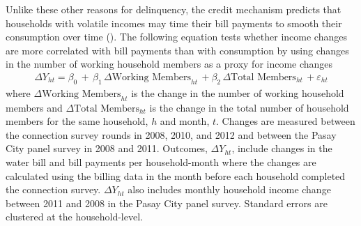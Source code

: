 \documentclass[12pt,table]{article}
\begin{document}


Unlike these other reasons for delinquency, the credit mechanism predicts that households with volatile incomes may time their bill payments to smooth their consumption over time (\cite{deaton1991saving}).  The following equation tests whether income changes are more correlated with bill payments than with consumption by using changes in the number of working household members as a proxy for income changes
\begin{align*}
\Delta Y_{ht} =\beta_0\,+\, \beta_1\, \Delta \text{Working Members}_{ht} \, + \beta_2\, \Delta \text{Total Members}_{ht}   \,+\varepsilon_{ht}
\end{align*}
where $ \Delta \text{Working Members}_{ht} $ is the change in the number of working household members and $\Delta \text{Total Members}_{ht}$ is the change in the total number of household members for the same household, $h$ and month, $t$.  Changes are measured between the connection survey rounds in 2008, 2010, and 2012 and between the Pasay City panel survey in 2008 and 2011.  Outcomes, $\Delta Y_{ht}$, include changes in the water bill and bill payments per household-month where the changes are calculated using the billing data in the month before each household completed the connection survey.  $\Delta Y_{ht}$ also includes monthly household income change between 2011 and 2008 in the Pasay City panel survey. Standard errors are clustered at the household-level. \\
\end{document}
